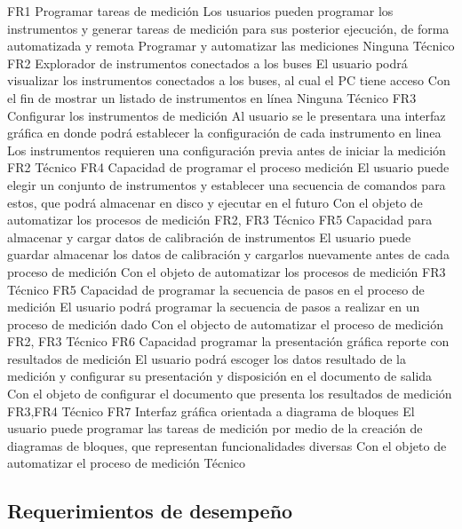 \documentclass[paper=a4,oneside,fontsize=12pt]{article}
\begin{document}
		{FR1}
			{Programar tareas de medición}
			{Los usuarios pueden programar los instrumentos y generar tareas de medición para sus posterior ejecución, de forma automatizada y remota}
			{Programar y automatizar las mediciones}
			{Ninguna}
			{Técnico}
		{FR2}
			{Explorador de instrumentos conectados a los buses}
			{El usuario podrá visualizar los instrumentos conectados a los buses, al cual el PC tiene acceso}
			{Con el fin de mostrar un listado de instrumentos en línea}
			{Ninguna}
			{Técnico}
		{FR3}
			{Configurar los instrumentos de medición}
			{Al usuario se le presentara una interfaz gráfica en donde podrá establecer la configuración de cada instrumento en linea}
			{Los instrumentos requieren una configuración previa antes de iniciar la medición}
			{FR2}
			{Técnico}
		{FR4}
			{Capacidad de programar el proceso medición}
			{El usuario puede elegir un conjunto de instrumentos y establecer una secuencia de comandos para estos, que podrá almacenar en disco y ejecutar en el futuro}
			{Con el objeto de automatizar los procesos de medición}
			{FR2, FR3}
			{Técnico}			
		{FR5}
			{Capacidad para almacenar y cargar datos de calibración de instrumentos}
			{El usuario puede guardar almacenar los datos de calibración y cargarlos nuevamente antes de cada proceso de medición}
			{Con el objeto de automatizar los procesos de medición}
			{FR3}
			{Técnico}
		{FR5}
			{Capacidad de programar la secuencia de pasos en el proceso de medición}
			{El usuario podrá programar la secuencia de pasos a realizar en un proceso de medición dado}
			{Con el objecto de automatizar el proceso de medición}
			{FR2, FR3}	
			{Técnico}		
		{FR6}
			{Capacidad programar la presentación gráfica reporte con resultados de medición}
			{El usuario podrá escoger los datos resultado de la medición y configurar su presentación y disposición en el documento de salida}
			{Con el objeto de configurar el documento que presenta los resultados de medición}
			{FR3,FR4}
			{Técnico}
		{FR7}
			{Interfaz gráfica orientada a diagrama de bloques}
			{El usuario puede programar las tareas de medición por medio de la creación de diagramas de bloques, que representan funcionalidades diversas}
			{Con el objeto de automatizar el proceso de medición}	
			{}		
			{Técnico}			
			
	\subsection{Requerimientos de desempeño}	
			
\end{document}
